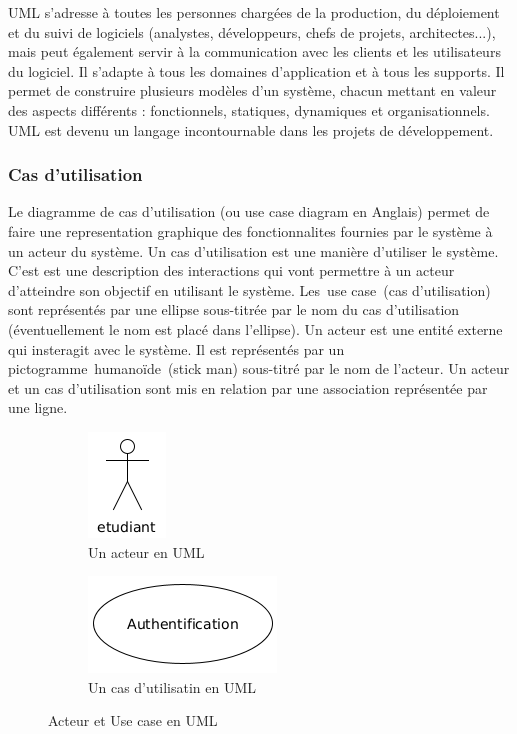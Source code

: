 \documentclass[12pt,a4paper]{article}
\begin{document}
	UML s’adresse à toutes les personnes chargées de la production, du déploiement et du suivi de logiciels (analystes, développeurs, chefs de projets, architectes...), mais peut également servir à la communication avec les clients et les utilisateurs du logiciel. Il s’adapte à tous les domaines d’application et à tous les supports. Il permet de construire plusieurs modèles d’un système, chacun mettant en valeur des aspects différents : fonctionnels, statiques, dynamiques et organisationnels. UML est devenu un langage incontournable dans les projets de développement.
	
	\subsubsection{Cas d'utilisation}
	Le diagramme de cas d'utilisation (ou use case diagram en Anglais) permet de faire une representation graphique des fonctionnalites fournies par le système à un acteur du système. Un cas d’utilisation est une manière d’utiliser le système. C’est est une description des interactions qui vont permettre à un acteur d'atteindre son objectif en utilisant le système. Les use case (cas d'utilisation) sont représentés par une ellipse sous-titrée par le nom du cas d'utilisation (éventuellement le nom est placé dans l'ellipse). Un acteur est une entité externe qui insteragit avec le système. Il est représentés par un pictogramme humanoïde (stick man) sous-titré par le nom de l'acteur.
	Un acteur et un cas d'utilisation sont mis en relation par une association représentée par une ligne.
	\begin{figure}[H]
		\centering
		\begin{subfigure}{.5\textwidth}
			\centering
			\includegraphics[width=.15\linewidth]{actor}
			\caption{Un acteur en UML}
			\label{fig:sub1}
		\end{subfigure}%
		\begin{subfigure}{.5\textwidth}
			\centering
			\includegraphics[width=.4\linewidth]{use_case}
			\caption{Un cas d'utilisatin en UML}
			\label{fig:sub2}
		\end{subfigure}
		\caption{Acteur et Use case en UML}
		\label{fig:figure1}
	\end{figure}
\end{document}
